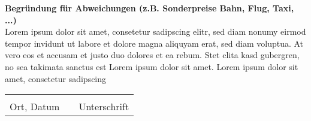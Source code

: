 \documentclass[a4paper,12pt]{article}
\begin{document}
\textbf{Begründung für Abweichungen (z.B. Sonderpreise Bahn, Flug, Taxi, ...)} \\
Lorem ipsum dolor sit amet, consetetur sadipscing elitr, sed diam nonumy eirmod tempor invidunt ut labore et dolore magna aliquyam erat, sed diam voluptua. At vero eos et accusam et justo duo dolores et ea rebum. Stet clita kasd gubergren, no sea takimata sanctus est Lorem ipsum dolor sit amet. Lorem ipsum dolor sit amet, consetetur sadipscing 
\vfill
\begin{tabular}{lp{4em}l}
\hspace{7cm}   && \hspace{7cm} \\
\cline{1-1}\cline{3-3}
 Ort, Datum     && Unterschrift
\end{tabular} 
\end{document}
